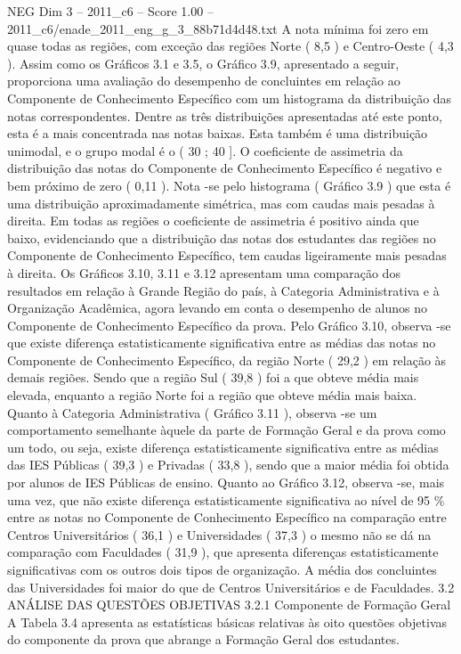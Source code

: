\begin{textsample}{NEG Dim 3 – 2011\_c6 – Score 1.00 – 2011\_c6/enade\_2011\_eng\_g\_3\_88b71d4d48.txt}
A nota mínima foi zero em quase todas as regiões, com exceção das regiões Norte ( 8,5 ) e Centro-Oeste ( 4,3 ).
Assim como os Gráficos 3.1 e 3.5, o Gráfico 3.9, apresentado a seguir, proporciona uma avaliação do desempenho de concluintes em relação ao Componente de Conhecimento Específico com um histograma da distribuição das notas correspondentes.
Dentre as três distribuições apresentadas até este ponto, esta é a mais concentrada nas notas baixas.
Esta também é uma distribuição unimodal, e o grupo modal é o ( 30 ; 40 ].
O coeficiente de assimetria da distribuição das notas do Componente de Conhecimento Específico é negativo e bem próximo de zero ( 0,11 ).
Nota -se pelo histograma ( Gráfico 3.9 ) que esta é uma distribuição aproximadamente simétrica, mas com caudas mais pesadas à direita.
Em todas as regiões o coeficiente de assimetria é positivo ainda que baixo, evidenciando que a distribuição das notas dos estudantes das regiões no Componente de Conhecimento Específico, tem caudas ligeiramente mais pesadas à direita.
Os Gráficos 3.10, 3.11 e 3.12 apresentam uma comparação dos resultados em relação à Grande Região do país, à Categoria Administrativa e à Organização Acadêmica, agora levando em conta o desempenho de alunos no Componente de Conhecimento Específico da prova.
Pelo Gráfico 3.10, observa -se que existe diferença estatisticamente significativa entre as médias das notas no Componente de Conhecimento Específico, da região Norte ( 29,2 ) em relação às demais regiões.
Sendo que a região Sul ( 39,8 ) foi a que obteve média mais elevada, enquanto a região Norte foi a região que obteve média mais baixa.
Quanto à Categoria Administrativa ( Gráfico 3.11 ), observa -se um comportamento semelhante àquele da parte de Formação Geral e da prova como um todo, ou seja, existe diferença estatisticamente significativa entre as médias das IES Públicas ( 39,3 ) e Privadas ( 33,8 ), sendo que a maior média foi obtida por alunos de IES Públicas de ensino.
Quanto ao Gráfico 3.12, observa -se, mais uma vez, que não existe diferença estatisticamente significativa ao nível de 95 \% entre as notas no Componente de Conhecimento Específico na comparação entre Centros Universitários ( 36,1 ) e Universidades ( 37,3 ) o mesmo não se dá na comparação com Faculdades ( 31,9 ), que apresenta diferenças estatisticamente significativas com os outros dois tipos de organização.
A média dos concluintes das Universidades foi maior do que de Centros Universitários e de Faculdades. 3.2 ANÁLISE DAS QUESTÕES OBJETIVAS 3.2.1 Componente de Formação Geral A Tabela 3.4 apresenta as estatísticas básicas relativas às oito questões objetivas do componente da prova que abrange a Formação Geral dos estudantes.

\end{textsample}
